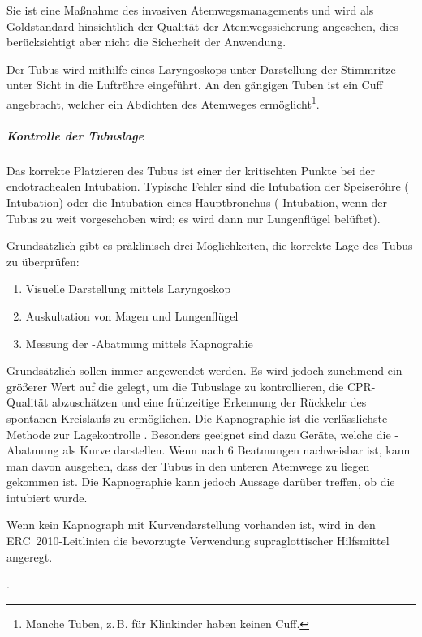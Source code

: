 \documentclass[
ngerman,
paper=a4,
asymmetric,
fontsize=10pt,
draft=false,
numbers=noenddot,
bibtotocnumbered,
footnotes=multiple,
]{scrreprt}
\newcommand{\jNEU}{\vspace{6pt}\noindent{\color{green}\sffamily\textbf{ADDED}\hrulefill\newline}}
\newcommand{\jNEUende}{\newline{\color{green}\rule{\linewidth}{3pt}\newline}}
\begin{document}
\jNEU
{ Sie ist eine Maßnahme des invasiven
Atemwegsmanagements und wird als Goldstandard hinsichtlich
der Qualität der Atemwegssicherung angesehen, dies
berücksichtigt aber nicht die Sicherheit der Anwendung.

Der Tubus wird mithilfe eines Laryngoskops unter Darstellung
der Stimmritze unter Sicht in die Luftröhre eingeführt.
An den gängigen Tuben ist ein Cuff angebracht, welcher ein
Abdichten des Atemweges ermöglicht\footnote{Manche Tuben,
z.\,B. für Klinkinder haben keinen Cuff.}.
 
 \subparagraph{Kontrolle der Tubuslage}
 Das korrekte Platzieren des Tubus ist einer der kritischten
 Punkte bei der endotrachealen Intubation. Typische Fehler
 sind die Intubation der Speiseröhre (
 Intubation) oder die Intubation eines Hauptbronchus
 ( Intubation, wenn der Tubus zu weit
 vorgeschoben wird; es wird dann nur  Lungenflügel belüftet).
 
 Grundsätzlich gibt es präklinisch drei Möglichkeiten, die
 korrekte Lage des Tubus zu überprüfen:
 \begin{enumerate}
   \item Visuelle Darstellung mittels Laryngoskop
   \item Auskultation von Magen und Lungenflügel
   \item Messung der -Abatmung mittels Kapnograhie
 \end{enumerate}
 
  Grundsätzlich sollen immer  angewendet werden.
 Es wird jedoch zunehmend ein größerer Wert auf die
  gelegt, um die Tubuslage zu kontrollieren,
 die CPR-Qualität abzuschätzen und eine frühzeitige Erkennung
der Rückkehr des spontanen Kreislaufs zu ermöglichen. Die
Kapnographie ist die verlässlichste Methode zur
Lagekontrolle \cite{Grmec2002}. Besonders
geeignet sind dazu Geräte, welche die -Abatmung als Kurve darstellen. Wenn nach 6
 Beatmungen  nachweisbar ist, kann man davon
 ausgehen, dass der Tubus in den unteren Atemwege zu liegen
 gekommen ist. Die Kapnographie kann jedoch  Aussage
 darüber treffen, ob die  intubiert wurde.
 
 Wenn kein Kapnograph mit Kurvendarstellung vorhanden ist,
 wird in den ERC~2010-Leitlinien die bevorzugte Verwendung
 supraglottischer Hilfsmittel
 angeregt.
}{}{}{}{}{}
.
\jNEUende
\end{document}
